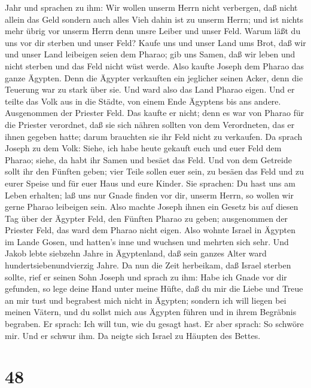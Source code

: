 Jahr und sprachen zu ihm: Wir wollen unserm Herrn nicht verbergen, daß
nicht allein das Geld sondern auch alles Vieh dahin ist zu unserm Herrn;
und ist nichts mehr übrig vor unserm Herrn denn unsre Leiber und unser
Feld.  Warum läßt du uns vor dir sterben und unser Feld?
Kaufe uns und unser Land ums Brot, daß wir und unser Land leibeigen
seien dem Pharao; gib uns Samen, daß wir leben und nicht sterben und das
Feld nicht wüst werde.  Also kaufte Joseph dem Pharao das
ganze Ägypten. Denn die Ägypter verkauften ein jeglicher seinen Acker,
denn die Teuerung war zu stark über sie. Und ward also das Land Pharao
eigen.  Und er teilte das Volk aus in die Städte, von einem
Ende Ägyptens bis ans andere.  Ausgenommen der Priester
Feld. Das kaufte er nicht; denn es war von Pharao für die Priester
verordnet, daß sie sich nähren sollten von dem Verordneten, das er ihnen
gegeben hatte; darum brauchten sie ihr Feld nicht zu verkaufen.
 Da sprach Joseph zu dem Volk: Siehe, ich habe heute
gekauft euch und euer Feld dem Pharao; siehe, da habt ihr Samen und
besäet das Feld.  Und von dem Getreide sollt ihr den
Fünften geben; vier Teile sollen euer sein, zu besäen das Feld und zu
eurer Speise und für euer Haus und eure Kinder.  Sie
sprachen: Du hast uns am Leben erhalten; laß uns nur Gnade finden vor
dir, unserm Herrn, so wollen wir gerne Pharao leibeigen sein.
 Also machte Joseph ihnen ein Gesetz bis auf diesen Tag
über der Ägypter Feld, den Fünften Pharao zu geben; ausgenommen der
Priester Feld, das ward dem Pharao nicht eigen.  Also
wohnte Israel in Ägypten im Lande Gosen, und hatten's inne und wuchsen
und mehrten sich sehr.  Und Jakob lebte siebzehn Jahre in
Ägyptenland, daß sein ganzes Alter ward hundertsiebenundvierzig Jahre.
 Da nun die Zeit herbeikam, daß Israel sterben sollte, rief
er seinen Sohn Joseph und sprach zu ihm: Habe ich Gnade vor dir
gefunden, so lege deine Hand unter meine Hüfte, daß du mir die Liebe und
Treue an mir tust und begrabest mich nicht in Ägypten; 
sondern ich will liegen bei meinen Vätern, und du sollst mich aus
Ägypten führen und in ihrem Begräbnis begraben. Er sprach: Ich will tun,
wie du gesagt hast.  Er aber sprach: So schwöre mir. Und er
schwur ihm. Da neigte sich Israel zu Häupten des Bettes.

\hypertarget{section-47}{%
\section{48}\label{section-47}}

